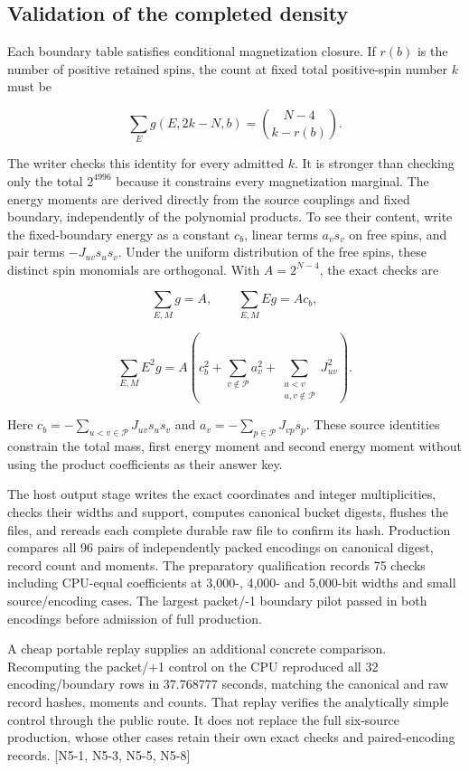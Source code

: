 \subsection{Validation of the completed density}\label{validation-of-the-completed-density}

Each boundary table satisfies conditional magnetization closure. If \(r(b)\) is the number of positive retained spins, the count at fixed total positive-spin number \(k\) must be

\[\sum_E g(E,2k-N,b)=\binom{N-4}{k-r(b)}.\]

The writer checks this identity for every admitted \(k\). It is stronger than checking only the total \(2^{4996}\) because it constrains every magnetization marginal. The energy moments are derived directly from the source couplings and fixed boundary, independently of the polynomial products. To see their content, write the fixed-boundary energy as a constant \(c_b\), linear terms \(a_v s_v\) on free spins, and pair terms \(-J_{uv}s_us_v\). Under the uniform distribution of the free spins, these distinct spin monomials are orthogonal. With \(A=2^{N-4}\), the exact checks are

\[\sum_{E,M}g=A,\qquad \sum_{E,M}Eg=A c_b,\]

\[\sum_{E,M}E^2g=A\left(c_b^2+\sum_{v\notin\mathcal P}a_v^2+\sum_{\substack{u<v\\u,v\notin\mathcal P}}J_{uv}^2\right).\]

Here \(c_b=-\sum_{u<v\in\mathcal P}J_{uv}s_us_v\) and \(a_v=-\sum_{p\in\mathcal P}J_{vp}s_p\). These source identities constrain the total mass, first energy moment and second energy moment without using the product coefficients as their answer key.

The host output stage writes the exact coordinates and integer multiplicities, checks their widths and support, computes canonical bucket digests, flushes the files, and rereads each complete durable raw file to confirm its hash. Production compares all 96 pairs of independently packed encodings on canonical digest, record count and moments. The preparatory qualification records 75 checks including CPU-equal coefficients at 3,000-, 4,000- and 5,000-bit widths and small source/encoding cases. The largest packet/-1 boundary pilot passed in both encodings before admission of full production.

A cheap portable replay supplies an additional concrete comparison. Recomputing the packet/+1 control on the CPU reproduced all 32 encoding/boundary rows in 37.768777 seconds, matching the canonical and raw record hashes, moments and counts. That replay verifies the analytically simple control through the public route. It does not replace the full six-source production, whose other cases retain their own exact checks and paired-encoding records. {[}N5-1, N5-3, N5-5, N5-8{]}

